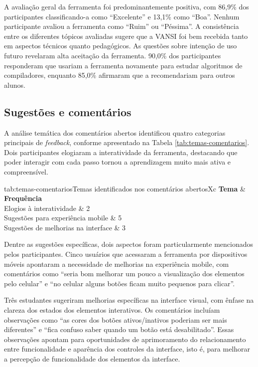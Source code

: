 A avaliação geral da ferramenta foi predominantemente positiva, com 86,9\% dos participantes classificando-a como ``Excelente'' e 13,1\% como ``Boa''. Nenhum participante avaliou a ferramenta como ``Ruim'' ou ``Péssima''. A consistência entre os diferentes tópicos avaliadas sugere que a VANSI foi bem recebida tanto em aspectos técnicos quanto pedagógicos. As questões sobre intenção de uso futuro revelaram alta aceitação da ferramenta. 90,0\% dos participantes responderam que usariam a ferramenta novamente para estudar algoritmos de compiladores, enquanto 85,0\% afirmaram que a recomendariam para outros alunos.

\subsection{Sugestões e comentários}

A análise temática dos comentários abertos identificou quatro categorias principais de \textit{feedback}, conforme apresentado na Tabela \ref{tab:temas-comentarios}. Dois participantes elogiaram a interatividade da ferramenta, destacando que poder interagir com cada passo tornou a aprendizagem muito mais ativa e compreensível.

\begin{mytabela}{tab:temas-comentarios}{Temas identificados nos comentários abertos}{Xc}
	\hline
	\textbf{Tema} & \textbf{Frequência} \\
	\hline
	Elogios à interatividade & 2 \\
	Sugestões para experiência mobile & 5 \\
	Sugestões de melhorias na interface & 3 \\
	\hline
\end{mytabela}

Dentre as sugestões específicas, dois aspectos foram particularmente mencionados pelos participantes. Cinco usuários que acessaram a ferramenta por dispositivos móveis apontaram a necessidade de melhorias na experiência mobile, com comentários como ``seria bom melhorar um pouco a visualização dos elementos pelo celular'' e ``no celular alguns botões ficam muito pequenos para clicar''.

Três estudantes sugeriram melhorias específicas na interface visual, com ênfase na clareza dos estados dos elementos interativos. Os comentários incluíam observações como ``as cores dos botões ativos/inativos poderiam ser mais diferentes'' e ``fica confuso saber quando um botão está desabilitado''. Essas observações apontam para oportunidades de aprimoramento do relacionamento entre funcionalidade e aparência dos controles da interface, isto é, para melhorar a percepção de funcionalidade dos elementos da interface.
